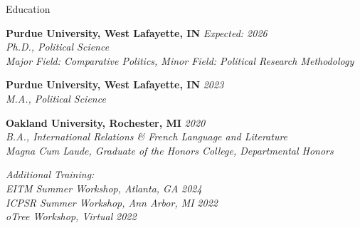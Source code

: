 \documentclass{resume} %
\begin{document}




\begin{rSection}{Education}

{\bf Purdue University, West Lafayette, IN} \hfill {\em Expected: 2026} 
\\ {\it Ph.D., Political Science
\\ Major Field: Comparative Politics, Minor Field: Political Research Methodology}

{\bf Purdue University, West Lafayette, IN} \hfill {\em 2023} 
\\ {\it M.A., Political Science}

{\bf Oakland University, Rochester, MI} \hfill {\em 2020} 
\\ {\it B.A., International Relations \& French Language and Literature \hfill 
\\Magna Cum Laude, Graduate of the Honors College, Departmental Honors}

{\it Additional Training:}
\\{\it EITM Summer Workshop, Atlanta, GA}
\hfill {\em 2024} 
\\{\it ICPSR Summer Workshop, Ann Arbor, MI}
\hfill {\em 2022} 
\\{\it oTree Workshop, Virtual}
\hfill {\em 2022}

\end{rSection}
\end{document}
